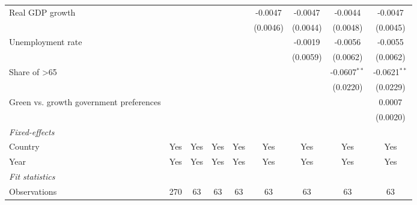 \begin{table}[htbp]
\begin{tabular}{lcccccccc}
      Real GDP growth                                                       &          &          &                 &                 & -0.0047         & -0.0047         & -0.0044         & -0.0047\\   
                                                                            &          &          &                 &                 & (0.0046)        & (0.0044)        & (0.0048)        & (0.0045)\\   
      Unemployment rate                                                     &          &          &                 &                 &                 & -0.0019         & -0.0056         & -0.0055\\   
                                                                            &          &          &                 &                 &                 & (0.0059)        & (0.0062)        & (0.0062)\\   
      Share of >65                                                          &          &          &                 &                 &                 &                 & -0.0607$^{**}$  & -0.0621$^{**}$\\   
                                                                            &          &          &                 &                 &                 &                 & (0.0220)        & (0.0229)\\   
      Green vs. growth government preferences                               &          &          &                 &                 &                 &                 &                 & 0.0007\\   
                                                                            &          &          &                 &                 &                 &                 &                 & (0.0020)\\   
      \midrule
      \emph{Fixed-effects}\\
      Country                                                               & Yes      & Yes      & Yes             & Yes             & Yes             & Yes             & Yes             & Yes\\  
      Year                                                                  & Yes      & Yes      & Yes             & Yes             & Yes             & Yes             & Yes             & Yes\\  
      \midrule
      \emph{Fit statistics}\\
      Observations                                                          & 270      & 63       & 63              & 63              & 63              & 63              & 63              & 63\\  

\end{tabular}
\end{table}
